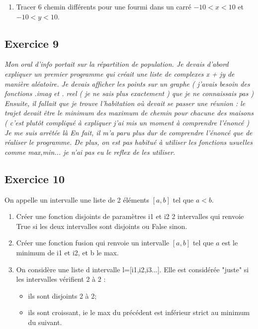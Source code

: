 \documentclass[10pt,fleqn]{article} %
\begin{document}
\begin{multicols}{2}
\begin{enumerate}

\item Tracer 6 chemin différents pour une fourmi dans un carré  $-10< x < 10$ et $-10 < y < 10$.
\end{enumerate}

\subsection*{Exercice 9}
\textit{
Mon oral d'info portait sur la répartition de population.
Je devais d'abord expliquer un premier programme qui créait une liste de complexes x + jy  de manière aléatoire.
Je devais afficher les points sur un graphe ( j'avais besoin des fonctions .imag et . reel ( je ne sais plus exactement ) que je ne connaissais pas ) 
Ensuite, il fallait que je trouve l'habitation où devait se passer une réunion : le trajet devait être le minimum des maximum de chemin pour chacune des maisons ( c'est plutôt compliqué à expliquer j'ai mis un moment à comprendre l'énoncé ) 
Je me suis arrêtée là
En fait, il m'a paru plus dur de comprendre l'énoncé que de réaliser le programme.
De plus, on est pas habitué à utiliser les fonctions usuelles comme max,min...  je n'ai pas eu le reflex de les utiliser.}


\subsection*{Exercice 10}
On appelle un intervalle une liste de 2 éléments $[a,b]$ tel que $a <b$.

\begin{enumerate}
\item Créer une fonction disjoints de paramètres i1 et i2 2 intervalles qui renvoie True si les deux intervalles sont disjoints ou False sinon.
\item Créer une fonction fusion qui renvoie un intervalle $[a,b]$ tel que $a$ est le minimum de i1 et i2, et b le max.
\item On considère une liste d intervalle l=[i1,i2,i3...]. Elle est considérée "juste" si les intervalles vérifient 2 à 2 :
\begin{itemize}
\item ils sont disjoints 2 à 2;
\item ils sont croissant, ie le max du précédent est inférieur strict au minimum du suivant.
\end{itemize}


\end{enumerate}
\end{multicols}
\end{document}
